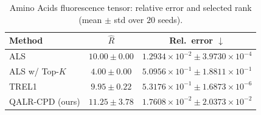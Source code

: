 \begin{table}[t]
\centering
\caption{Amino Acids fluorescence tensor: relative error and selected rank (mean \(\pm\) std over \(20\) seeds).}
\label{tab:results_amino}
\begin{tabular}{@{}lcc@{}}
\toprule
Method & \(\hat R\) & Rel.\ error \(\downarrow\) \\
\midrule
ALS & \(10.00 \pm 0.00\) & \(1.2934{\times}10^{-2} \pm 3.9730{\times}10^{-4}\) \\
ALS w/ Top-\(K\) & \(4.00 \pm 0.00\) & \(5.0956{\times}10^{-1} \pm 1.8811{\times}10^{-1}\) \\
TREL1~\cite{shi2017tensorrankestimation} & \(9.95 \pm 0.22\) & \(5.3176{\times}10^{-1} \pm 1.6873{\times}10^{-6}\) \\
QALR-CPD (ours) & \(11.25 \pm 3.78\) & \(1.7608{\times}10^{-2} \pm 2.0373{\times}10^{-2}\) \\
\bottomrule
\end{tabular}
\end{table}